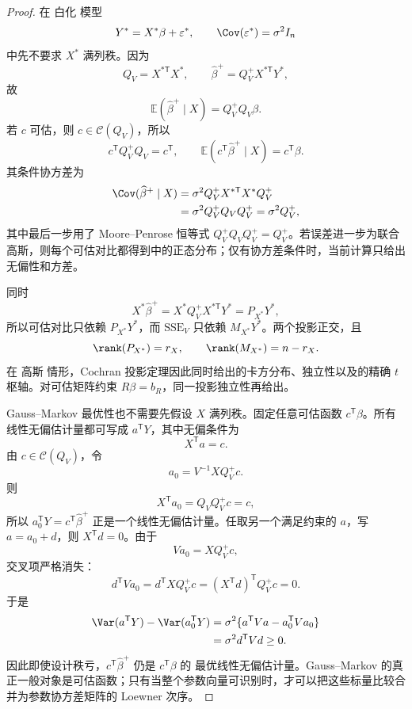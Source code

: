 \begin{proof}
在 白化 模型
\[
 Y^*=X^*\beta+\varepsilon^*,
 \qquad
 \Cov(\varepsilon^*)=\sigma^2I_n
\]
中先不要求 $X^*$ 满列秩。因为
\[
 Q_V=X^{*\mathsf T}X^*,
 \qquad
 \widehat\beta^+=Q_V^+X^{*\mathsf T}Y^*,
\]
故
\[
 \mathbb E(\widehat\beta^+\mid X)
 =Q_V^+Q_V\beta.
\]
若 $c$ 可估，则 $c\in\mathcal C(Q_V)$，所以
\[
 c^{\mathsf T}Q_V^+Q_V=c^{\mathsf T},
 \qquad
 \mathbb E(c^{\mathsf T}\widehat\beta^+\mid X)=c^{\mathsf T}\beta.
\]
其条件协方差为
\begin{align*}
 \Cov(\widehat\beta^+\mid X)
 &=\sigma^2Q_V^+X^{*\mathsf T}X^*Q_V^+\\
 &=\sigma^2Q_V^+Q_VQ_V^+
 =\sigma^2Q_V^+,
\end{align*}
其中最后一步用了 Moore--Penrose 恒等式 $Q_V^+Q_VQ_V^+=Q_V^+$。若误差进一步为联合 高斯，则每个可估对比都得到中的正态分布；仅有协方差条件时，当前计算只给出无偏性和方差。

同时
\[
 X^*\widehat\beta^+
 =X^*Q_V^+X^{*\mathsf T}Y^*
 =P_{X^*}Y^*,
\]
所以可估对比只依赖 $P_{X^*}Y^*$，而 $\mathrm{SSE}_V$ 只依赖 $M_{X^*}Y^*$。两个投影正交，且
\[
 \rank(P_{X^*})=r_X,
 \qquad
 \rank(M_{X^*})=n-r_X.
\]
在 高斯 情形，Cochran 投影定理因此同时给出的卡方分布、独立性以及的精确 $t$ 枢轴。对可估矩阵约束 $R\beta=b_R$，同一投影独立性再给出。

Gauss--Markov 最优性也不需要先假设 $X$ 满列秩。固定任意可估函数 $c^{\mathsf T}\beta$。所有线性无偏估计量都可写成 $a^{\mathsf T}Y$，其中无偏条件为
\[
 X^{\mathsf T}a=c.
\]
由 $c\in\mathcal C(Q_V)$，令
\[
 a_0=V^{-1}XQ_V^+c.
\]
则
\[
 X^{\mathsf T}a_0=Q_VQ_V^+c=c,
\]
所以 $a_0^{\mathsf T}Y=c^{\mathsf T}\widehat\beta^+$ 正是一个线性无偏估计量。任取另一个满足约束的 $a$，写 $a=a_0+d$，则 $X^{\mathsf T}d=0$。由于
\[
 Va_0=XQ_V^+c,
\]
交叉项严格消失：
\[
 d^{\mathsf T}Va_0
 =d^{\mathsf T}XQ_V^+c
 =(X^{\mathsf T}d)^{\mathsf T}Q_V^+c
 =0.
\]
于是
\begin{align*}
 \Var(a^{\mathsf T}Y)-\Var(a_0^{\mathsf T}Y)
 &=\sigma^2\{a^{\mathsf T}Va-a_0^{\mathsf T}Va_0\}\\
 &=\sigma^2d^{\mathsf T}Vd
 \ge 0.
\end{align*}
因此即使设计秩亏，$c^{\mathsf T}\widehat\beta^+$ 仍是 $c^{\mathsf T}\beta$ 的 最优线性无偏估计量。Gauss--Markov 的真正一般对象是可估函数；只有当整个参数向量可识别时，才可以把这些标量比较合并为参数协方差矩阵的 Loewner 次序。
\end{proof}


